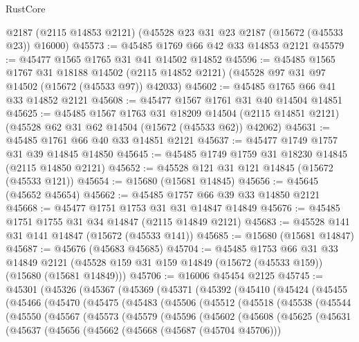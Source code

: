 \begin{lexlean}{RustCore}
\begin{coremodule}
    @2187
    (@2115 @14853 @2121)
    (@45528 @23 @31 @23 @2187 (@15672 (@45533 @23)) @16000)
@45573 := @45485 @1769 @66 @42 @33 @14853 @2121
@45579 := @45477 @1565 @1765 @31 @41 @14502 @14852
@45596 := @45485
    @1565
    @1767
    @31
    @18188
    @14502
    (@2115 @14852 @2121)
    (@45528 @97 @31 @97 @14502 (@15672 (@45533 @97)) @42033)
@45602 := @45485 @1765 @66 @41 @33 @14852 @2121
@45608 := @45477 @1567 @1761 @31 @40 @14504 @14851
@45625 := @45485
    @1567
    @1763
    @31
    @18209
    @14504
    (@2115 @14851 @2121)
    (@45528 @62 @31 @62 @14504 (@15672 (@45533 @62)) @42062)
@45631 := @45485 @1761 @66 @40 @33 @14851 @2121
@45637 := @45477 @1749 @1757 @31 @39 @14845 @14850
@45645 := @45485 @1749 @1759 @31 @18230 @14845 (@2115 @14850 @2121)
@45652 := @45528 @121 @31 @121 @14845 (@15672 (@45533 @121))
@45654 := @15680 (@15681 @14845)
@45656 := @45645 (@45652 @45654)
@45662 := @45485 @1757 @66 @39 @33 @14850 @2121
@45668 := @45477 @1751 @1753 @31 @31 @14847 @14849
@45676 := @45485 @1751 @1755 @31 @34 @14847 (@2115 @14849 @2121)
@45683 := @45528 @141 @31 @141 @14847 (@15672 (@45533 @141))
@45685 := @15680 (@15681 @14847)
@45687 := @45676 (@45683 @45685)
@45704 := @45485
    @1753
    @66
    @31
    @33
    @14849
    @2121
    (@45528 @159 @31 @159 @14849 (@15672 (@45533 @159)) (@15680 (@15681 @14849)))
@45706 := @16006 @45454 @2125
@45745 := @45301
    (@45326
      (@45367
        (@45369
          (@45371
            (@45392
              (@45410
                (@45424
                  (@45455
                    (@45466
                      (@45470
                        (@45475
                          (@45483
                            (@45506
                              (@45512
                                (@45518
                                  (@45538
                                    (@45544
                                      (@45550
                                        (@45567
                                          (@45573
                                            (@45579
                                              (@45596
                                                (@45602
                                                  (@45608
                                                    (@45625
                                                      (@45631
                                                        (@45637
                                                          (@45656
                                                            (@45662
                                                              (@45668 (@45687 (@45704 @45706)))

\end{coremodule}
\end{lexlean}
